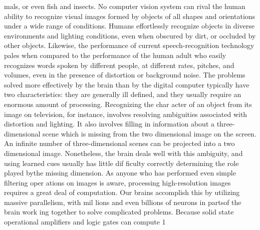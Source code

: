 \documentclass[11pt,a4paper,twocolumn]{article}
\begin{document}
mals, or even fish and insects. No computer vision system 
can rival the human ability to recognize visual images 
formed by objects of all shapes and orientations under a 
wide range of conditions. Humans effortlessly recognize 
objects in diverse environments and lighting conditions, 
even when obscured by dirt, or occluded by other objects. 
Likewise, the performance of current speech-recognition 
technology pales when compared to the performance of 
the human adult who easily recognizes words spoken by 
different people, at different rates, pitches, and volumes, 
even in the presence of distortion or background noise. 
The problems solved more effectively by the brain than 
by the digital computer typically have two characteristics: 
they are generally ill defined, and they usually require an 
enormous amount of processing. Recognizing the char
acter of an object from its image on television, for instance, 
involves resolving ambiguities associated with distortion 
and lighting. It also involves filling in information about a 
three-dimensional scene which is missing from the two
dimensional image on the screen. An infinite number of 
three-dimensional scenes can be projected into a two
dimensional image. Nonetheless, the brain deals well with 
this ambiguity, and using learned cues usually has little dif
ficulty correctly determining the role played bythe missing 
dimension. 
As anyone who has performed even simple filtering oper
ations on images is aware, processing high-resolution 
images requires a great deal of computation. Our brains 
accomplish this by utilizing massive parallelism, with mil
lions and even billions of neurons in partsof the brain work
ing together to solve complicated problems. Because solid
state operational amplifiers and logic gates can compute 
1






\newpage

\end{document}
